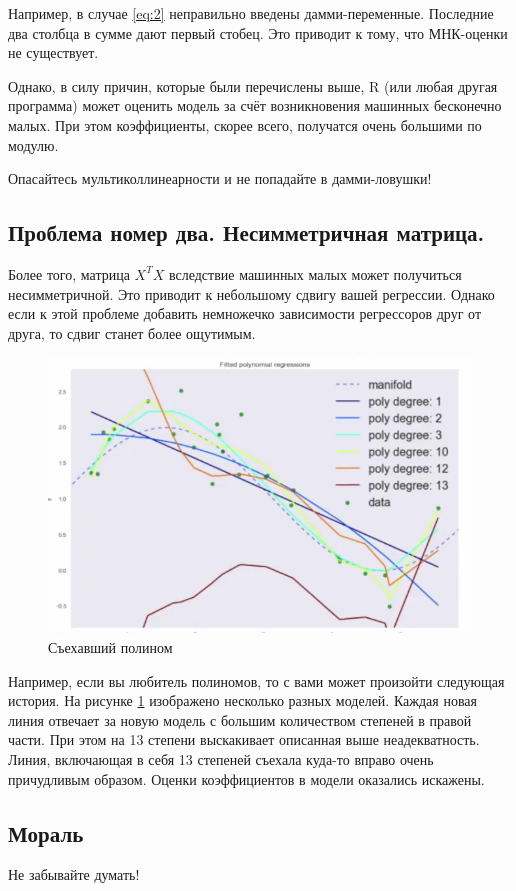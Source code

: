 \documentclass[12pt, a4paper]{article}
\begin{document}
Например, в случае \eqref{eq:2} неправильно введены дамми-переменные. Последние два столбца в сумме дают первый стобец. Это приводит к тому, что МНК-оценки не существует. 

Однако, в силу причин, которые были перечислены выше, R (или любая другая программа) может оценить модель за счёт возникновения машинных бесконечно малых. При этом коэффициенты, скорее всего, получатся очень большими по модулю. 

Опасайтесь мультиколлинеарности и не попадайте в дамми-ловушки! 

\subsection{Проблема номер два. Несимметричная матрица.}

Более того, матрица $X^T X$ вследствие машинных малых может получиться несимметричной. Это приводит к небольшому сдвигу вашей регрессии. Однако если к этой проблеме добавить немножечко зависимости регрессоров друг от друга, то сдвиг станет более ощутимым.


\begin{figure}[H] \label{pic:1}
\includegraphics[scale=0.6]{polinom.png}
\caption{Съехавший полином}
\end{figure}

Например, если вы любитель полиномов, то с вами может произойти следующая история. На рисунке \ref{pic:1} изображено несколько разных моделей. Каждая новая линия отвечает за новую модель с большим количеством степеней в правой части. При этом на 13 степени выскакивает описанная выше неадекватность. Линия, включающая в себя 13 степеней съехала куда-то вправо очень причудливым образом. Оценки коэффициентов в модели оказались искажены. 

\subsection{Мораль} 

Не забывайте думать! 
\end{document}
